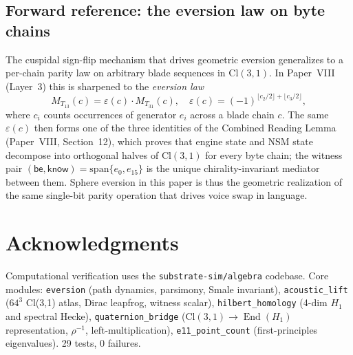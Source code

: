 \documentclass[11pt,a4paper]{article}
\theoremstyle{plain}
\theoremstyle{definition}
\theoremstyle{remark}
\numberwithin{equation}{section}
\providecommand{\Cl}{\mathrm{Cl}}
\DeclareMathOperator{\End}{End}
\begin{document}
\subsection{Forward reference: the eversion law on byte chains}

The cuspidal sign-flip mechanism that drives geometric eversion
generalizes to a per-chain parity law on arbitrary blade sequences
in $\Cl(3,1)$.  In Paper~VIII (Layer~3) this is sharpened to the
\emph{eversion law}
\[
  M_{T_{13}}(c) = \varepsilon(c) \cdot M_{T_{31}}(c),
  \quad
  \varepsilon(c) = (-1)^{\lfloor c_2/2 \rfloor + \lfloor c_3/2 \rfloor},
\]
where $c_i$ counts occurrences of generator $e_i$ across a blade
chain $c$.  The same $\varepsilon(c)$ then forms one of the three
identities of the Combined Reading Lemma
(Paper~VIII, Section~12), which proves that engine state and NSM
state decompose into orthogonal halves of $\Cl(3,1)$ for every
byte chain; the witness pair $(\mathsf{be}, \mathsf{know}) =
\mathrm{span}\{e_0, e_{15}\}$ is the unique chirality-invariant mediator
between them.  Sphere eversion in this paper is thus the geometric
realization of the same single-bit parity operation that drives
voice swap in language.


\section*{Acknowledgments}

\begin{sloppypar}
Computational verification uses the \texttt{substrate-sim/algebra}
codebase.  Core modules: \texttt{eversion} (path dynamics, parsimony,
Smale invariant), \texttt{acoustic\_lift} ($64^3$ Cl(3,1) atlas, Dirac
leapfrog, witness scalar), \texttt{hilbert\_homology} (4-dim $H_1$ and
spectral Hecke), \texttt{quaternion\_bridge} ($\Cl(3,1) \to \End(H_1)$
representation, $\rho^{-1}$, left-multiplication),
\texttt{e11\_point\_count} (first-principles eigenvalues).
29 tests, 0 failures.
\end{sloppypar}
\end{document}
